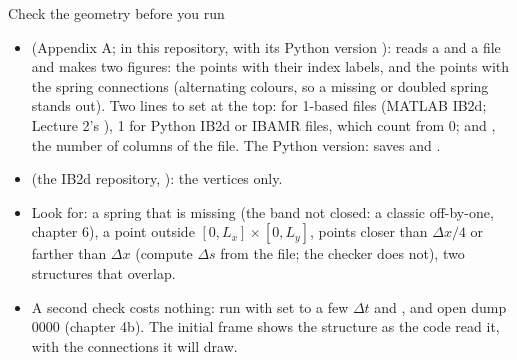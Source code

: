 \documentclass[aspectratio=169,11pt]{beamer}
\begin{document}
\begin{frame}{Check the geometry before you run}
\label{fr:check}
\small
\begin{itemize}
  \item {} (Appendix A;  in this repository, with its Python version ): reads a  and a  file and makes two figures: the points with their index labels, and the points with the spring connections (alternating colours, so a missing or doubled spring stands out). Two lines to set at the top:  for 1-based files (MATLAB IB2d; Lecture 2's ), 1 for Python IB2d or IBAMR files, which count from 0; and , the number of columns of the  file. The Python version:  saves  and .
  \item {} (the IB2d repository, ): the vertices only.
  \item Look for: a spring that is missing (the band not closed: a classic off-by-one, chapter 6), a point outside $[0, L_x] \times [0, L_y]$, points closer than $\Delta x/4$ or farther than $\Delta x$ (compute $\Delta s$ from the file; the checker does not), two structures that overlap.
  \item A second check costs nothing: run with  set to a few $\Delta t$ and , and open dump 0000 (chapter 4b). The initial frame shows the structure as the code read it, with the connections it will draw.
\end{itemize}
\end{frame}
\end{document}
